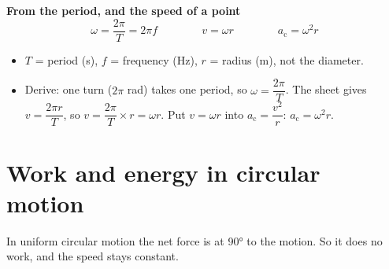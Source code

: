 \textbf{From the period, and the speed of a point} \hscbadgenotonsheet
\[ \omega = \frac{2\pi}{T} = 2\pi f \qquad\qquad v = \omega r \qquad\qquad a_\mathrm{c} = \omega^2 r \]
\begin{itemize}
  \item $T$ = period (s), $f$ = frequency (Hz), $r$ = radius (m), not the diameter.
  \item Derive: one turn ($2\pi$ rad) takes one period, so $\omega = \dfrac{2\pi}{T}$. The
        sheet gives $v = \dfrac{2\pi r}{T}$, so ${v = \dfrac{2\pi}{T}\times r = \omega r}$. Put
        $v = \omega r$ into $a_\mathrm{c} = \dfrac{v^2}{r}$: $a_\mathrm{c} = \omega^2 r$.
\end{itemize}

\section{Work and energy in circular motion}\label{ch3:sec:work}

\begin{bigidea}
In uniform circular motion the net force is at \ang{90} to the motion. So it does no work,
and the speed stays constant.
\end{bigidea}

\begin{keywords}
\end{keywords}

